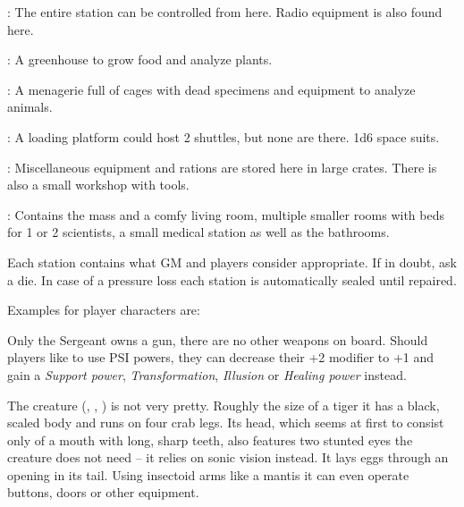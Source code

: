 {		: The entire station can be controlled from here. Radio equipment is also found here.

		: A greenhouse to grow food and analyze plants.

		: A menagerie full of cages with dead specimens and equipment to analyze animals.

		: A loading platform could host 2 shuttles, but none are there. 1d6 space suits.

		: Miscellaneous equipment and rations are stored here in large crates. There is also a small workshop with tools.

		: Contains the mass and a comfy living room, multiple smaller rooms with beds for 1 or 2 scientists, a small medical station as well as the bathrooms.

		Each station contains what GM and players consider appropriate. If in doubt, ask a die. In case of a pressure loss each station is automatically sealed until repaired.


		\noindent
		Examples for player characters are:


		\noindent
		Only the Sergeant owns a gun, there are no other weapons on board. Should players like to use PSI powers, they can decrease their +2 modifier to +1 and gain a \emph{Support power}, \emph{Transformation}, \emph{Illusion} or \emph{Healing power} instead.


		\noindent
		The creature (, , ) is not very pretty. Roughly the size of a tiger it has a black, scaled body and runs on four crab legs. Its head, which seems at first to consist only of a mouth with long, sharp teeth, also features two stunted eyes the creature does not need -- it relies on sonic vision instead. It lays eggs through an opening in its tail. Using insectoid arms like a mantis it can even operate buttons, doors or other equipment.

}
